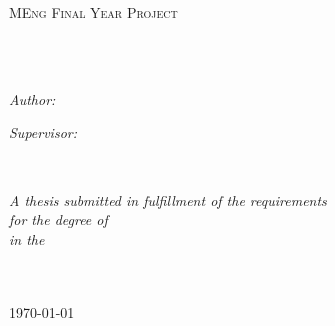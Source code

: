 \documentclass[
    11pt,
    oneside, %
    english,
    singlespacing, %
    headsepline, %
]{MastersDoctoralThesis}
\author{Nicolás \textsc{D'Cotta}} %
\begin{document}
    \frontmatter
    \pagestyle{plain}


    \begin{titlepage}
        \begin{center}

            \vspace*{.06\textheight}
            {\scshape\LARGE \univname\par}\vspace{1.5cm}
            \textsc{\Large MEng Final Year Project}\\[0.5cm]

            \HRule \\[0.4cm]
            {\huge \bfseries \ttitle\par}\vspace{0.4cm} %
            \HRule \\[1.5cm]

            \begin{minipage}[t]{0.4\textwidth}
                \begin{flushleft}
                    \large
                    \emph{Author:}\\
                    \href{https://nico.dcotta.eu}{\authorname}
                \end{flushleft}
            \end{minipage}
            \begin{minipage}[t]{0.4\textwidth}
                \begin{flushright}
                    \large
                    \emph{Supervisor:} \\
                    \href{https://www.doc.ic.ac.uk/~wjk/}{\supname}
                \end{flushright}
            \end{minipage}\\[3cm]

            \vfill

            \large \textit{A thesis submitted in fulfillment of the requirements\\ for the degree of \degreename}\\[0.3cm] %
            \textit{in the}\\[0.4cm]
            \facname \\ \deptname\\[2cm]

            \vfill

            {\large \today}\\[4cm] %

            \vfill
        \end{center}
    \end{titlepage}
\end{document}
